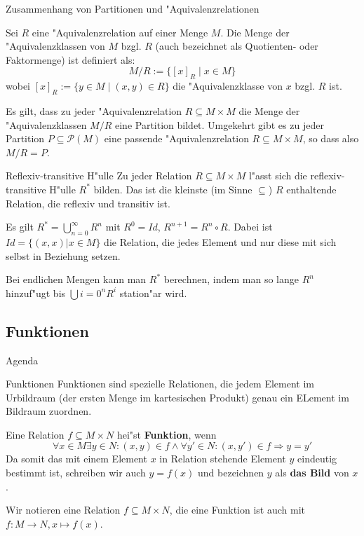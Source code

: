 \documentclass{beamer}
\begin{document}
\begin{frame}{Zusammenhang von Partitionen und "Aquivalenzrelationen}

  \begin{definition}
    Sei $R$ eine "Aquivalenzrelation auf einer Menge $M$. Die Menge der "Aquivalenzklassen von $M$ bzgl. $R$ (auch bezeichnet als Quotienten- oder Faktormenge) ist definiert als:
    \[M/R := \{[x]_R \mid x \in M\}\]
    wobei $[x]_R := \{y \in M \mid (x, y) \in R\}$ die "Aquivalenzklasse von $x$ bzgl. $R$ ist.
  \end{definition}
  Es gilt, dass zu jeder "Aquivalenzrelation $R\subseteq M\times M$ die Menge der "Aquivalenzklassen $M/R$ eine Partition bildet. Umgekehrt gibt es zu jeder Partition $P\subseteq\mathscr{P}(M)$ eine passende "Aquivalenzrelation $R\subseteq M\times M$, so dass also $M/R=P$.
\end{frame}

\begin{frame}{Reflexiv-transitive H"ulle}
Zu jeder Relation $R\subseteq M\times M$ l"asst sich die reflexiv-transitive H"ulle $R^*$ bilden. Das ist die kleinste (im Sinne $\subseteq$) $R$ enthaltende Relation, die reflexiv und transitiv ist.

Es gilt $R^*=\bigcup_{n=0}^\infty R^n$ mit $R^0=Id$, $R^{n+1}=R^n\circ R$. Dabei ist $Id=\{(x,x)|x\in M\}$ die Relation, die jedes Element und nur diese mit sich selbst in Beziehung setzen. 

Bei endlichen Mengen kann man $R^*$ berechnen, indem man so lange $R^n$ hinzuf"ugt bis $\bigcup{i=0}^n R^i$ station"ar wird.
\end{frame}
\subsection{Funktionen}

\begin{frame}{Agenda}
   
    
  \tableofcontents[currentsection]
  \end{frame}
\begin{frame}{Funktionen}
  Funktionen sind spezielle Relationen, die jedem Element im Urbildraum (der ersten Menge im kartesischen Produkt) genau ein ELement im Bildraum zuordnen.
  \begin{definition}[Funktionen]
    Eine Relation $f\subseteq M\times N$ hei"st \textbf{Funktion}, wenn \[\forall x\in M \exists y\in N: (x,y)\in f\wedge \forall y'\in N:(x,y')\in f\Rightarrow y=y'\]
    Da somit das mit einem Element $x$ in Relation stehende Element $y$ eindeutig bestimmt ist, schreiben wir auch $y=f(x)$ und bezeichnen $y$ als \textbf{das Bild} von $x$.
  \end{definition}
  Wir notieren eine Relation $f\subseteq M\times N$, die eine Funktion ist auch mit $f:M\to N, x\mapsto f(x)$.
\end{frame}
\end{document}
